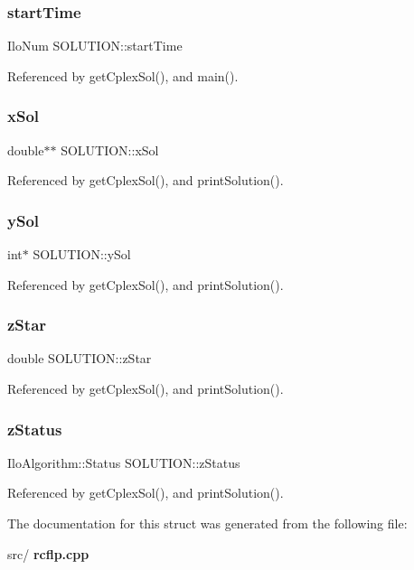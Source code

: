 \subsubsection{start\+Time}
{\footnotesize\ttfamily Ilo\+Num S\+O\+L\+U\+T\+I\+O\+N\+::start\+Time}



Referenced by get\+Cplex\+Sol(), and main().

\mbox{\label{structSOLUTION_a00dd4c6acc8c4855907129f0824011f4}} 
\subsubsection{x\+Sol}
{\footnotesize\ttfamily double$\ast$$\ast$ S\+O\+L\+U\+T\+I\+O\+N\+::x\+Sol}



Referenced by get\+Cplex\+Sol(), and print\+Solution().

\mbox{\label{structSOLUTION_ad5f89e3522ac2eca6d42748026f18ff2}} 
\subsubsection{y\+Sol}
{\footnotesize\ttfamily int$\ast$ S\+O\+L\+U\+T\+I\+O\+N\+::y\+Sol}



Referenced by get\+Cplex\+Sol(), and print\+Solution().

\mbox{\label{structSOLUTION_ade090dee207193de4c06605732ede125}} 
\subsubsection{z\+Star}
{\footnotesize\ttfamily double S\+O\+L\+U\+T\+I\+O\+N\+::z\+Star}



Referenced by get\+Cplex\+Sol(), and print\+Solution().

\mbox{\label{structSOLUTION_ae81190f94f47fef19ff54ff8461eabd1}} 
\subsubsection{z\+Status}
{\footnotesize\ttfamily Ilo\+Algorithm\+::\+Status S\+O\+L\+U\+T\+I\+O\+N\+::z\+Status}



Referenced by get\+Cplex\+Sol(), and print\+Solution().



The documentation for this struct was generated from the following file\+:\begin{DoxyCompactItemize}
\item 
src/\textbf{ rcflp.\+cpp}\end{DoxyCompactItemize}
